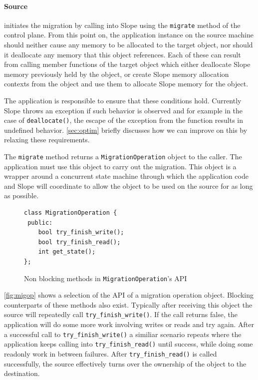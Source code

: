\paragraph{Source}
initiates the migration by calling into Slope using the \texttt{migrate} method of the control plane. From this point
on, the application instance on the source machine should neither
cause any memory to be allocated to the target object, nor should it deallocate any memory that
this object references. Each of these can result from calling member functions
of the target object which either deallocate Slope memory previously held by the
object, or create Slope memory allocation contexts from the object and
use them to allocate Slope memory for the object.

The application is responsible
to ensure that these conditions hold. Currently Slope throws an exception if such
behavior is observed and for example in the case of \texttt{deallocate()}, the
escape of the exception from the function results in undefined behavior.
\autoref{sec:optim} briefly discusses how we can improve on this by relaxing
these requirements.

The \texttt{migrate} method returns a \texttt{MigrationOperation} object to
the caller. The application must use this object to carry out the migration.
This object is a wrapper around a concurrent state machine through which the
application code and Slope will coordinate to allow the object to be used on
the source for as long as possible.


\begin{figure}[tp]
\begin{lstlisting}
class MigrationOperation {
 public:
    bool try_finish_write();
    bool try_finish_read();
    int get_state();
};
\end{lstlisting}
\caption{
    Non blocking methods in \texttt{MigrationOperation}'s API
}
\label{fig:migop}
\end{figure}

\autoref{fig:migop} shows a selection of the API of a migration operation
object. Blocking counterparts of these methods also exist. Typically after
receiving this object the source will repeatedly call \texttt{try\_finish\_write()}.
If the call returns false, the application will do some more work involving
writes or reads and try again. After a successful call to \texttt{try\_finish\_write()}
a similiar scenario repeats where the application keeps calling into
\texttt{try\_finish\_read()} until success, while doing some readonly work in between
failures. After \texttt{try\_finish\_read()} is called successfully, the source
effectively turns over the ownership of the object to the destination.


